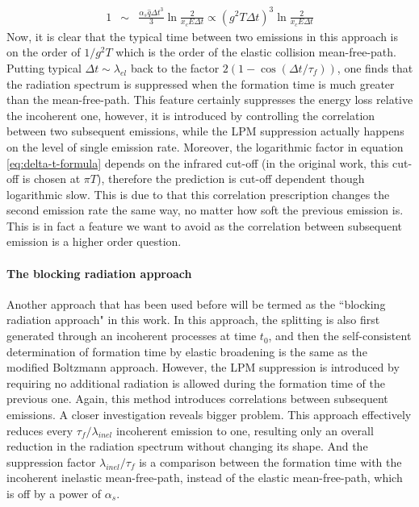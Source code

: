 \documentclass[aps, prc, reprint, amsmath, groupedaddress, nofootinbib]{revtex4-1}
\begin{document}
\begin{appendices}
\begin{eqnarray}
1 &\sim&  \frac{\alpha_s\hat{q}\Delta t^3}{3}\ln\frac{2}{ x_c E \Delta t } \propto (g^2 T \Delta t)^3 \ln\frac{2}{ x_c E \Delta t }
\label{eq:delta-t-formula}
\end{eqnarray}
Now, it is clear that the typical time between two emissions in this approach is on the order of $1/g^2T$ which is the order of the elastic collision mean-free-path.
Putting typical $\Delta t \sim \lambda_{el}$ back to the factor $2(1-\cos(\Delta t/\tau_f))$, one finds that the radiation spectrum is suppressed when the formation time is much greater than the mean-free-path.
This feature certainly suppresses the energy loss relative the incoherent one, however, it is introduced by controlling the correlation between two subsequent emissions, while the LPM suppression actually happens on the level of single emission rate.
Moreover, the logarithmic factor in equation \ref{eq:delta-t-formula} depends on the infrared cut-off (in the original work, this cut-off is chosen at $\pi T$), therefore the prediction is cut-off dependent though logarithmic slow.
This is due to that this correlation prescription changes the second emission rate the same way, no matter how soft the previous emission is.
This is in fact a feature we want to avoid as the correlation between subsequent emission is a higher order question.

\paragraph{The blocking radiation approach}
Another approach that has been used before will be termed as the ``blocking radiation approach" in this work.
In this approach, the splitting is also first generated through an incoherent processes at time $t_0$, and then the self-consistent determination of formation time by elastic broadening is the same as the modified Boltzmann approach.
However, the LPM suppression is introduced by requiring no additional radiation is allowed during the formation time of the previous one.
Again, this method introduces correlations between subsequent emissions.
A closer investigation reveals bigger problem.
This approach effectively reduces every $\tau_f/\lambda_{inel}$ incoherent emission to one, resulting only an overall reduction in the radiation spectrum without changing its shape.
And the suppression factor $\lambda_{inel}/\tau_f$ is a comparison between  the formation time with the incoherent inelastic mean-free-path, instead of the elastic mean-free-path, which is off by a power of $\alpha_s$.


\end{appendices}
\end{document}
